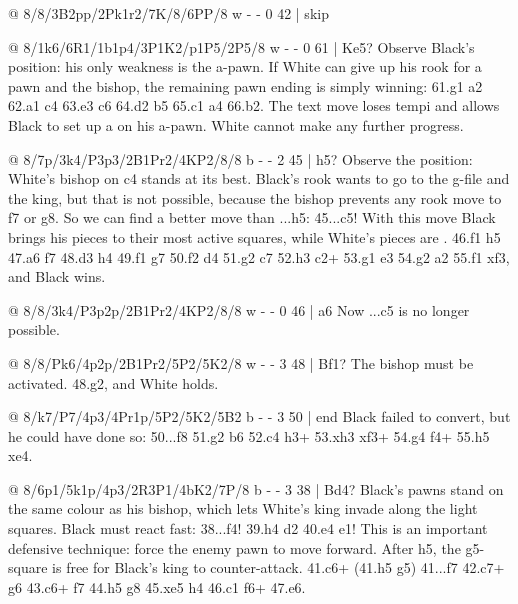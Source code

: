 @ 8/8/3B2pp/2Pk1r2/7K/8/6PP/8 w - - 0 42 | skip

@ 8/1k6/6R1/1b1p4/3P1K2/p1P5/2P5/8 w - - 0 61 | Ke5?
Observe Black's position: his only weakness is the a-pawn. If White can give up his rook for a pawn
and the bishop, the remaining pawn ending is simply winning:
61.\R g1 a2 62.\R a1 \B c4 63.\K e3 \K c6 64.\K d2 \K b5 65.\K c1 \K a4 66.\K b2. The text move loses
tempi and allows Black to set up a 
on his a-pawn. White cannot make any further progress.

@ 8/7p/3k4/P3p3/2B1Pr2/4KP2/8/8 b - - 2 45 | h5?
Observe the position: White's bishop on c4 stands at its best. Black's rook wants to go to the
g-file and  the king, but that is not possible, because
the bishop prevents any rook move to f7 or g8. So we can find a better move than ...h5: 45...\K c5!
With this move Black brings his pieces to their most active squares,
while White's pieces are . 46.\B f1 h5 47.a6
\R f7 48.\B d3 h4 49.\B f1 \R g7 50.\K f2 \K d4 51.\B g2 \R c7 52.\B h3 \R c2+ 53.\K g1 \K e3 54.\B g2
\R a2 55.\B f1 \K xf3, and Black wins.

@ 8/8/3k4/P3p2p/2B1Pr2/4KP2/8/8 w - - 0 46 | a6
Now ...\K c5 is no longer possible.

@ 8/8/Pk6/4p2p/2B1Pr2/5P2/5K2/8 w - - 3 48 | Bf1?
The bishop must be activated. 48.\K g2, and White holds.

@ 8/k7/P7/4p3/4Pr1p/5P2/5K2/5B2 b - - 3 50 | end
Black failed to convert, but he could have done so: 50...\R f8 51.\K g2 \K b6 52.\B c4 h3+ 53.\K xh3
\R xf3+ 54.\K g4 \R f4+ 55.\K h5 \R xe4.

@ 8/6p1/5k1p/4p3/2R3P1/4bK2/7P/8 b - - 3 38 | Bd4?
Black's pawns stand on the same colour as his bishop, which lets White's king invade along the
light squares. Black must react fast:
38...\B f4! 39.h4 \B d2 40.\K e4 \B e1! This is an important defensive technique: force the enemy pawn
to move forward. After h5, the g5-square is free for Black's king to counter-attack.
41.\R c6+ (41.h5 \K g5) 41...\K f7 42.\R c7+ \K g6 43.\R c6+ \K f7 44.h5 \K g8 45.\K xe5 \B h4
46.\R c1 \B f6+ 47.\K e6.

